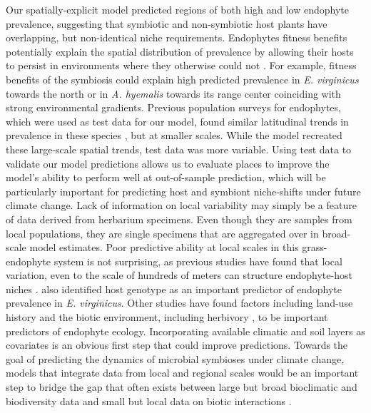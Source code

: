 \documentclass[11pt]{article}
\let\cite\citep
\begin{document}
Our spatially-explicit model predicted regions of both high and low endophyte prevalence, suggesting that symbiotic and non-symbiotic host plants have overlapping, but non-identical niche requirements.
Endophytes fitness benefits potentially explain the spatial distribution of prevalence by allowing their hosts to persist in environments where they otherwise could not \citep{afkhami2014mutualist, kazenel2015mutualistic}.
For example, fitness benefits of the symbiosis could explain high predicted prevalence in \emph{E. virginicus} towards the north or in \emph{A. hyemalis} towards its range center coinciding with strong environmental gradients.
Previous population surveys for endophytes, which were used as test data for our model, found similar latitudinal trends in prevalence in these species \citep{sneck2017variation,rudgers2009benefits}, but at smaller scales. 
While the model recreated these large-scale spatial trends, test data was more variable. 
Using test data to validate our model predictions allows us to evaluate places to improve the model's ability to perform well at out-of-sample prediction, which will be particularly important for predicting host and symbiont niche-shifts under future climate change.
Lack of information on local variability may simply be a feature of data derived from herbarium specimens. 
Even though they are samples from local populations, they are single specimens that are aggregated over in broad-scale model estimates.
Poor predictive ability at local scales in this grass-endophyte system is not surprising, as previous studies have found that local variation, even to the scale of hundreds of meters can structure endophyte-host niches \cite{kazenel2015mutualistic}. 
\citet{sneck2017variation} also identified host genotype as an important predictor of endophyte prevalence in \emph{E. virginicus}.
Other studies have found factors including land-use history \cite{vikuk2019infection} and the biotic environment, including herbivory \cite{rudgers2016long}, to be important predictors of endophyte ecology.
Incorporating available climatic and soil layers as covariates is an obvious first step that could improve predictions.
Towards the goal of predicting the dynamics of microbial symbioses under climate change, models that integrate data from local and regional scales would be an important step to bridge the gap that often exists between large but broad bioclimatic and biodiversity data and small but local data on biotic interactions \cite{miller2019recent, isaac2020data}.
\end{document}
